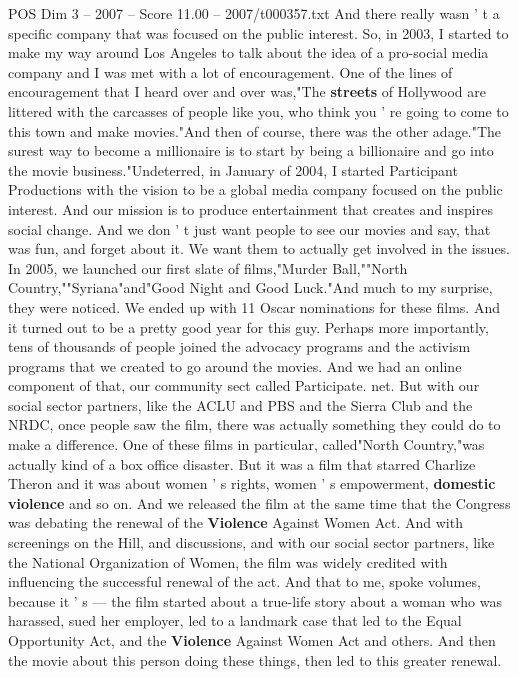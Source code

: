 \begin{textsample}{POS Dim 3 – 2007 – Score 11.00 – 2007/t000357.txt}
And there really wasn ' t a specific company that was focused on the public interest.
So, in 2003, I started to make my way around Los Angeles to talk about the idea of a pro-social media company and I was met with a lot of encouragement.
One of the lines of encouragement that I heard over and over was,"The \textbf{streets} of Hollywood are littered with the carcasses of people like you, who think you ' re going to come to this town and make movies."And then of course, there was the other adage."The surest way to become a millionaire is to start by being a billionaire and go into the movie business."Undeterred, in January of 2004, I started Participant Productions with the vision to be a global media company focused on the public interest.
And our mission is to produce entertainment that creates and inspires social change.
And we don ' t just want people to see our movies and say, that was fun, and forget about it.
We want them to actually get involved in the issues.
In 2005, we launched our first slate of films,"Murder Ball,""North Country,""Syriana"and"Good Night and Good Luck."And much to my surprise, they were noticed.
We ended up with 11 Oscar nominations for these films.
And it turned out to be a pretty good year for this guy.
Perhaps more importantly, tens of thousands of people joined the advocacy programs and the activism programs that we created to go around the movies.
And we had an online component of that, our community sect called Participate. net.
But with our social sector partners, like the ACLU and PBS and the Sierra Club and the NRDC, once people saw the film, there was actually something they could do to make a difference.
One of these films in particular, called"North Country,"was actually kind of a box office disaster.
But it was a film that starred Charlize Theron and it was about women ' s rights, women ' s empowerment, \textbf{domestic} \textbf{violence} and so on.
And we released the film at the same time that the Congress was debating the renewal of the \textbf{Violence} Against Women Act.
And with screenings on the Hill, and discussions, and with our social sector partners, like the National Organization of Women, the film was widely credited with influencing the successful renewal of the act.
And that to me, spoke volumes, because it ' s — the film started about a true-life story about a woman who was harassed, sued her employer, led to a landmark case that led to the Equal Opportunity Act, and the \textbf{Violence} Against Women Act and others.
And then the movie about this person doing these things, then led to this greater renewal.

\end{textsample}
